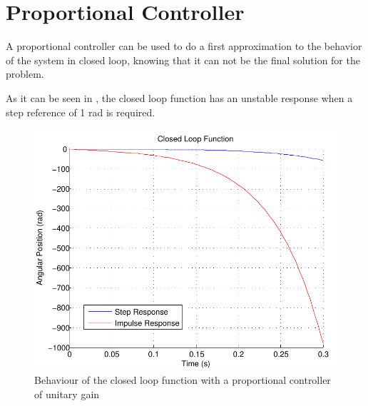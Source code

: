 \section{Proportional Controller}\label{chap:pController}
A proportional controller can be used to do a first approximation to the behavior of the system in closed loop, knowing that it can not be the final solution for the problem.

As it can be seen in , the closed loop function has an unstable response when a step reference of 1 rad is required.

\begin{figure}[H] 
	\centering 
	\includegraphics[scale=0.6]{figures/closedLoopResponse}	
	\caption{Behaviour of the closed loop function with a proportional controller of unitary gain}
	\label{closedLoopResponse}
\end{figure}

